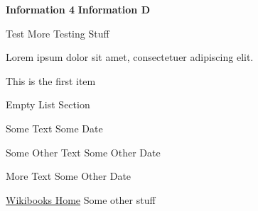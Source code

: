 \documentclass[11pt,letterpaper]{article}
\begin{document}
\bigskip


\large{\textbf{Information 4}} \hfill \large{\textbf{Information D}}

\normalsize{
    \textcolor{customgray}{Test}
    } \hfill
\normalsize{
    \textcolor{customgray}{More Testing Stuff}
    }

\normalsize{Lorem ipsum dolor sit amet, consectetuer adipiscing elit.}
\smallskip
\begin{itemize*}  %
    \item This is the first item
\end{itemize*}

\bigskip
\medskip


\textsf{\textcolor{customlightblue}{\Large{Empty List Section}}} %

\smallskip

\normalsize{Some Text} \hfill \normalsize{Some Date}

\normalsize{Some Other Text} \hfill \normalsize{Some Other Date}

\normalsize{More Text} \hfill \normalsize{Some Other Date}

\href{http://www.wikibooks.org}{Wikibooks Home} \hfill \normalsize{Some other stuff}

\end{document}
